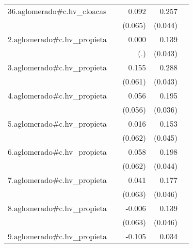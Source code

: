 {\begin{longtable}{l*{4}{D{.}{.}{-1}}}
\addlinespace
36.aglomerado#c.hv\_cloacas&                     &       0.092         &       0.257\sym{***}&                     \\
            &                     &     (0.065)         &     (0.044)         &                     \\
\addlinespace
2.aglomerado#c.hv\_propieta&                     &       0.000         &       0.139\sym{**} &                     \\
            &                     &         (.)         &     (0.043)         &                     \\
\addlinespace
3.aglomerado#c.hv\_propieta&                     &       0.155\sym{*}  &       0.288\sym{***}&                     \\
            &                     &     (0.061)         &     (0.043)         &                     \\
\addlinespace
4.aglomerado#c.hv\_propieta&                     &       0.056         &       0.195\sym{***}&                     \\
            &                     &     (0.056)         &     (0.036)         &                     \\
\addlinespace
5.aglomerado#c.hv\_propieta&                     &       0.016         &       0.153\sym{***}&                     \\
            &                     &     (0.062)         &     (0.045)         &                     \\
\addlinespace
6.aglomerado#c.hv\_propieta&                     &       0.058         &       0.198\sym{***}&                     \\
            &                     &     (0.062)         &     (0.044)         &                     \\
\addlinespace
7.aglomerado#c.hv\_propieta&                     &       0.041         &       0.177\sym{***}&                     \\
            &                     &     (0.063)         &     (0.046)         &                     \\
\addlinespace
8.aglomerado#c.hv\_propieta&                     &      -0.006         &       0.139\sym{**} &                     \\
            &                     &     (0.063)         &     (0.046)         &                     \\
\addlinespace
9.aglomerado#c.hv\_propieta&                     &      -0.105         &       0.034         &                     \\

\end{longtable}}
